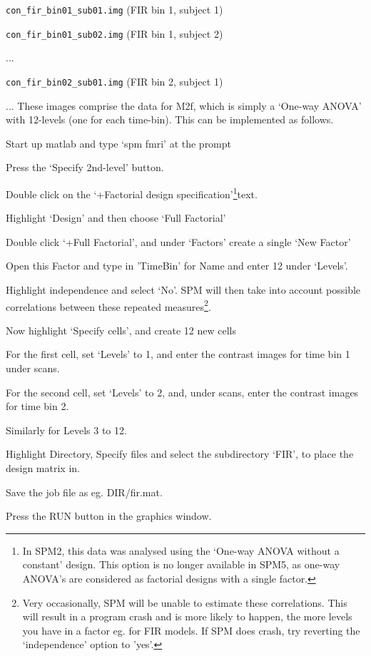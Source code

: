 \bi
\item{\verb!con_fir_bin01_sub01.img!	(FIR bin 1, subject 1)}
\item{\verb!con_fir_bin01_sub02.img!	(FIR bin 1, subject 2)}
\item{...}
\item{\verb!con_fir_bin02_sub01.img!	(FIR bin 2, subject 1)}
\item{...}
\ei
These images comprise the data for M2f, which is simply a `One-way ANOVA' with 12-levels (one for each time-bin). This can be implemented as follows.
\bi
\item{Start up matlab and type `spm fmri' at the prompt}
\item{Press the `Specify 2nd-level' button.}
\item{Double click on the `+Factorial design specification'\footnote{In SPM2, this data was analysed using the `One-way ANOVA without a constant' design. This option is no longer available in SPM5, as one-way ANOVA's are considered as factorial designs with a single factor.}text.}
\item{Highlight `Design' and then choose `Full Factorial'}
\item{Double click `+Full Factorial', and under `Factors' create a single `New Factor'}
\item{Open this Factor and type in 'TimeBin' for Name and enter 12 under `Levels'.}
\item{Highlight independence and select `No'. SPM will then take into account possible correlations between these repeated measures\footnote{Very occasionally, SPM will be unable to estimate these correlations. This will result in a program crash and is more likely to happen, the more levels you have in a factor eg. for FIR models. If SPM does crash, try reverting the `independence' option to 'yes'.}.}                                \item{Now highlight `Specify cells', and create 12 new cells}  \item{For the first cell, set `Levels' to 1, and enter the contrast images for time bin 1 under scans.}    
\item{For the second cell, set `Levels' to 2, and, under scans, enter the 
contrast images for time bin 2.}   
\item{Similarly for Levels 3 to 12.}               \item{Highlight Directory, Specify files and select the 
subdirectory `FIR', to place the design matrix in.}
\item{Save the job file as eg. {\sf DIR/fir.mat}}.
\item{Press the RUN button in the graphics window.}
\ei

